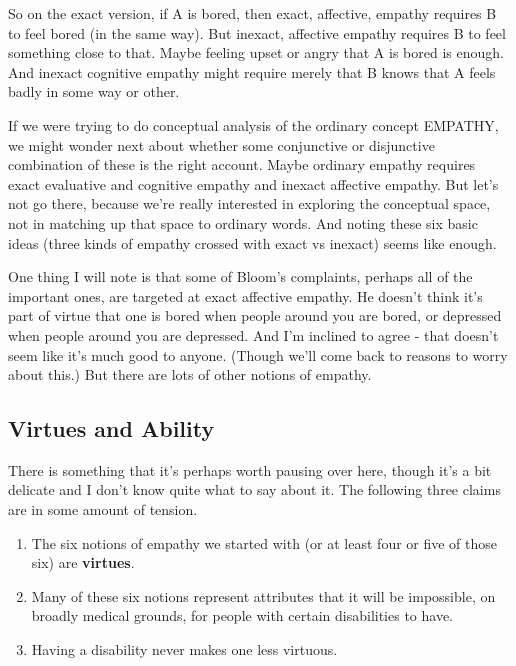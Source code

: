 \documentclass[
]{article}
\providecommand{\tightlist}{%
  \setlength{\itemsep}{0pt}\setlength{\parskip}{0pt}}
\begin{document}
So on the exact version, if A is bored, then exact, affective, empathy
requires B to feel bored (in the same way). But inexact, affective
empathy requires B to feel something close to that. Maybe feeling upset
or angry that A is bored is enough. And inexact cognitive empathy might
require merely that B knows that A feels badly in some way or other.

If we were trying to do conceptual analysis of the ordinary concept
EMPATHY, we might wonder next about whether some conjunctive or
disjunctive combination of these is the right account. Maybe ordinary
empathy requires exact evaluative and cognitive empathy and inexact
affective empathy. But let's not go there, because we're really
interested in exploring the conceptual space, not in matching up that
space to ordinary words. And noting these six basic ideas (three kinds
of empathy crossed with exact vs inexact) seems like enough.

One thing I will note is that some of Bloom's complaints, perhaps all of
the important ones, are targeted at exact affective empathy. He doesn't
think it's part of virtue that one is bored when people around you are
bored, or depressed when people around you are depressed. And I'm
inclined to agree - that doesn't seem like it's much good to anyone.
(Though we'll come back to reasons to worry about this.) But there are
lots of other notions of empathy.

\hypertarget{virtues-and-ability}{%
\subsection{Virtues and Ability}\label{virtues-and-ability}}

There is something that it's perhaps worth pausing over here, though
it's a bit delicate and I don't know quite what to say about it. The
following three claims are in some amount of tension.

\begin{enumerate}
\def\labelenumi{\arabic{enumi}.}
\tightlist
\item
  The six notions of empathy we started with (or at least four or five
  of those six) are \textbf{virtues}.
\item
  Many of these six notions represent attributes that it will be
  impossible, on broadly medical grounds, for people with certain
  disabilities to have.
\item
  Having a disability never makes one less virtuous.
\end{enumerate}
\end{document}

